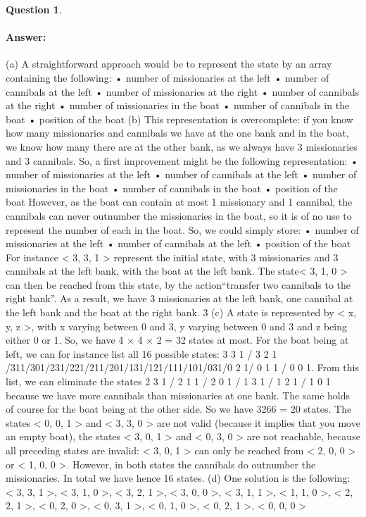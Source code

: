 \documentclass[11pt,a4paper]{article}
\theoremstyle{definition}%
\newtheorem{Q}{Question}[] %
\newcommand{\reponse}[1]{%
\ifthenelse {\boolean{corrige}} {\paragraph{Answer:} \color{darkblue}   #1\color{black}} {}
}
\begin{document}
\begin{Q}
\reponse{
    (a) A straightforward approach would be to represent the state by an array containing the
following:
•
 number of missionaries at the left
•
 number of cannibals at the left
•
 number of missionaries at the right
•
 number of cannibals at the right
•
 number of missionaries in the boat
•
 number of cannibals in the boat
•
 position of the boat
(b) This representation is overcomplete: if you know how many missionaries and cannibals
we have at the one bank and in the boat, we know how many there are at the other
bank, as we always have 3 missionaries and 3 cannibals. So, a first improvement might
be the following representation:
•
 number of missionaries at the left
•
 number of cannibals at the left
•
 number of missionaries in the boat
•
 number of cannibals in the boat
•
 position of the boat
However, as the boat can contain at most 1 missionary and 1 cannibal, the cannibals
can never outnumber the missionaries in the boat, so it is of no use to represent the
number of each in the boat. So, we could simply store:
• number of missionaries at the left
• number of cannibals at the left
• position of the boat
For instance < 3, 3, 1 > represent the initial state, with 3 missionaries and 3 cannibals
at the left bank, with the boat at the left bank. The state< 3, 1, 0 > can then be
reached from this state, by the action“transfer two cannibals to the right bank”. As a
result, we have 3 missionaries at the left bank, one cannibal at the left bank and the
boat at the right bank.
3
(c) A state is represented by < x, y, z >, with x varying between 0 and 3, y varying between
0 and 3 and z being either 0 or 1. So, we have 4 × 4 × 2 = 32 states at most.
For the boat being at left, we can for instance list all 16 possible states: 3 3 1 / 3 2 1
/311/301/231/221/211/201/131/121/111/101/031/0
2 1/ 0 1 1 / 0 0 1.
From this list, we can eliminate the states 2 3 1 / 2 1 1 / 2 0 1 / 1 3 1 / 1 2 1 / 1 0
1 because we have more cannibals than missionaries at one bank. The same holds of
course for the boat being at the other side. So we have 3266 = 20 states.
The states < 0, 0, 1 > and < 3, 3, 0 > are not valid (because it implies that you move
an empty boat), the states < 3, 0, 1 > and < 0, 3, 0 > are not reachable, because
all preceding states are invalid: < 3, 0, 1 > can only be reached from < 2, 0, 0 > or
< 1, 0, 0 >. However, in both states the cannibals do outnumber the missionaries. In
total we have hence 16 states.
(d) One solution is the following:
< 3, 3, 1 >, < 3, 1, 0 >, < 3, 2, 1 >, < 3, 0, 0 >, < 3, 1, 1 >, < 1, 1, 0 >, < 2, 2, 1 >,
< 0, 2, 0 >, < 0, 3, 1 >, < 0, 1, 0 >, < 0, 2, 1 >, < 0, 0, 0 >

}
\end{Q}
\end{document}
